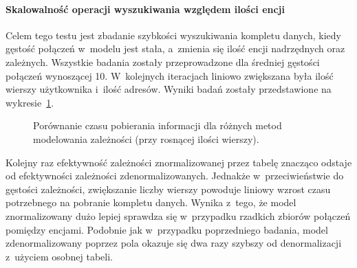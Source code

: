 \paragraph{Skalowalność operacji wyszukiwania względem ilości encji}

Celem tego testu jest zbadanie szybkości wyszukiwania kompletu danych, kiedy gęstość połączeń w~modelu jest stała, a~zmienia się ilość encji nadrzędnych oraz zależnych. Wszystkie badania zostały przeprowadzone dla średniej gęstości połączeń wynoszącej 10. W~kolejnych iteracjach liniowo zwiększana była ilość wierszy użytkownika i~ilość adresów. Wyniki badań zostały przedstawione na wykresie~\ref{fig:select_time_relation_quantity_comparison}.

\begin{figure}[ht!]
	\centering

	\caption{Porównanie czasu pobierania informacji dla różnych metod modelowania zależności (przy rosnącej ilości wierszy).}
	\label{fig:select_time_relation_quantity_comparison}
\end{figure}

Kolejny raz efektywność zależności znormalizowanej przez tabelę znacząco odstaje od efektywności zależności zdenormalizowanych. Jednakże w~przeciwieństwie do gęstości zależności, zwiększanie liczby wierszy powoduje liniowy wzrost czasu potrzebnego na pobranie kompletu danych. Wynika z~tego, że model znormalizowany dużo lepiej sprawdza się w~przypadku rzadkich zbiorów połączeń pomiędzy encjami. Podobnie jak w~przypadku poprzedniego badania, model zdenormalizowany poprzez pola okazuje się dwa razy szybszy od denormalizacji z~użyciem osobnej tabeli.


